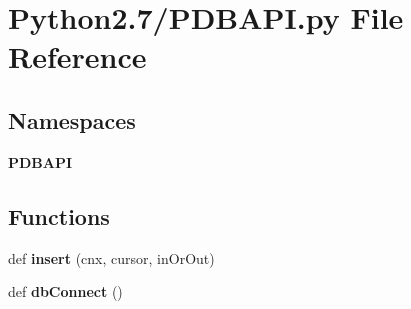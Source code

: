 \section{Python2.7/\+P\+D\+B\+A\+PI.py File Reference}
\label{_87_2_p_d_b_a_p_i_8py}
\subsection*{Namespaces}
\begin{DoxyCompactItemize}
\item 
 {\bf P\+D\+B\+A\+PI}
\end{DoxyCompactItemize}
\subsection*{Functions}
\begin{DoxyCompactItemize}
\item 
def {\bf insert} (cnx, cursor, in\+Or\+Out)
\item 
def {\bf db\+Connect} ()
\end{DoxyCompactItemize}

